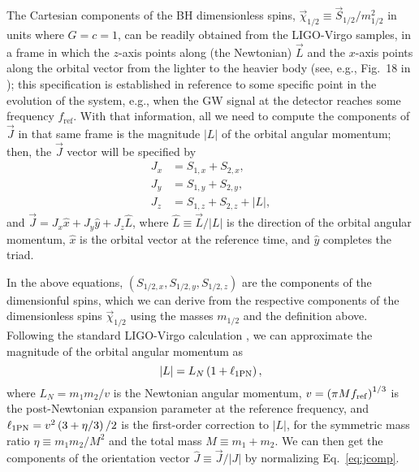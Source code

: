 \documentclass[aps,prd,twocolumn,superscriptaddress,preprintnumbers,floatfix,nofootinbib]{revtex4-2}
\begin{document}
The Cartesian components of the \ac{BH} dimensionless spins, $\vec{\chi}_{1/2} \equiv \vec{S}_{1/2} / m_{1/2}^2$ in units where $G=c=1$, can be readily obtained from the LIGO-Virgo samples, in a frame in which the $z$-axis points along (the Newtonian) $\vec{L}$ and the $x$-axis points along the orbital vector from the lighter to the heavier body \cite{LALSuite:spins} (see, e.g., Fig.~18 in \cite{Isi:2022mbx}); this specification is established in reference to some specific point in the evolution of the system, e.g., when the \ac{GW} signal at the detector reaches some frequency $f_\mathrm{ref}$.
With that information, all we need to compute the components of $\vec{J}$ in that same frame is the magnitude $|L|$ of the orbital angular momentum; then, the $\vec{J}$ vector will be specified by
\begin{subequations}
\label{eq:jcomp}
\begin{align}
J_x &= S_{1,x} + S_{2,x}, \\
J_y &= S_{1,y} + S_{2,y}, \\
J_z &= S_{1,z} + S_{2,z} + |L|,
\end{align}
\end{subequations}
and $\vec{J} = J_x \hat{x} + J_y \hat{y} + J_z \hat{L}$, where $\hat{L} \equiv \vec{L}/|L|$ is the direction of the orbital angular momentum, $\hat{x}$ is the orbital vector at the reference time, and $\hat{y}$ completes the triad.

In the above equations, $(S_{1/2,x},S_{1/2,y},S_{1/2,z})$ are the components of the dimensionful spins, which we can derive from the respective components of the dimensionless spins $\vec{\chi}_{1/2}$ using the masses $m_{1/2}$ and the definition above. 
Following the standard LIGO-Virgo calculation \cite{LALSuite:spins}, we can approximate the magnitude of the orbital angular momentum as \cite{Kidder:1995zr,Bohe:2012mr}
\begin{equation}
|L| = L_N \left(1 + \ell_{\rm 1PN}\right),
\end{equation}
where $L_N = m_1 m_2 / v$ is the Newtonian angular momentum, $v = \left( \pi M f_{\rm ref} \right)^{1/3}$ is the post-Newtonian expansion parameter at the reference frequency, and $\ell_{\rm 1PN} = v^2 \left( 3 + \eta /3 \right)/2$ is the first-order correction to $|L|$, for the symmetric mass ratio $\eta \equiv m_1 m_2/M^2$ and the total mass $M \equiv m_1 + m_2$.
We can then get the components of the orientation vector $\hat{J} \equiv \vec{J} /|J|$ by normalizing Eq.~\eqref{eq:jcomp}.
\end{document}
